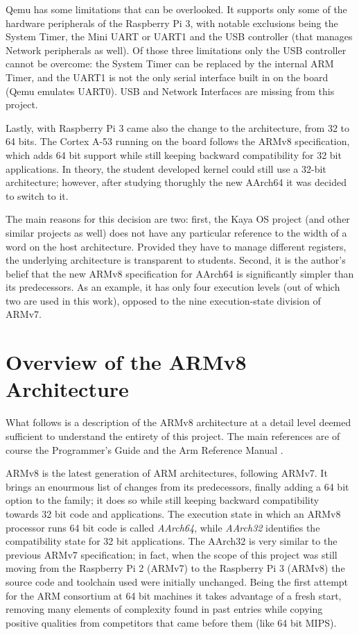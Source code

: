 \documentclass[12pt,a4paper,openright,twoside]{report}
\begin{document}
Qemu has some limitations that can be overlooked. It supports only some of the
hardware peripherals of the Raspberry Pi 3, with notable exclusions being the
System Timer, the Mini UART or UART1 and the USB controller 
(that manages Network peripherals as well).
Of those three limitations only the USB controller cannot be overcome: the 
System Timer can be replaced by the internal ARM Timer, and the UART1 is not
the only serial interface built in on the board (Qemu emulates UART0).
USB and Network Interfaces are missing from this project.

Lastly, with Raspberry Pi 3 came also the change to the architecture, from 32 
to 64 bits. The Cortex A-53 running on the board follows the ARMv8 specification,
which adds 64 bit support while still keeping backward compatibility for 32 bit
applications. In theory, the student developed kernel could still use a 32-bit
architecture; however, after studying thorughly the new AArch64 it was decided
to switch to it.

The main reasons for this decision are two: first, the Kaya OS project (and
other similar projects as well) does not have any particular reference to the
width of a word on the host architecture. Provided they have to manage different
registers, the underlying architecture is transparent to students.
Second, it is the author's belief that the new ARMv8 specification for AArch64
is significantly simpler than its predecessors. As an example, it has only four execution
levels (out of which two are used in this work), opposed to the nine execution-state 
division of ARMv7.

\clearpage{\pagestyle{empty}\cleardoublepage}
\chapter{Overview of the ARMv8 Architecture}
What follows is a description of the ARMv8 architecture at a detail level deemed
sufficient to understand the entirety of this project. The main references are 
of course the Programmer's Guide \cite{guide} and the Arm Reference Manual \cite{armarm}.

ARMv8 is the latest generation of ARM architectures, following ARMv7. It brings
an enourmous list of changes from its predecessors, finally adding a 64 bit option
to the family; it does so while still keeping backward compatibility towards 32 bit
code and applications. The execution state in which an ARMv8 processor runs 64 bit
code is called \textit{AArch64}, while \textit{AArch32} identifies the compatibility
state for 32 bit applications.
The AArch32 is very similar to the previous ARMv7 specification; in fact, when 
the scope of this project was still moving from the Raspberry Pi 2 (ARMv7) to the
Raspberry Pi 3 (ARMv8) the source code and toolchain used were initially unchanged.
Being the first attempt for the ARM consortium at 64 bit machines it takes advantage
of a fresh start, removing many elements of complexity found in past entries while
copying positive qualities from competitors that came before them (like 64 bit MIPS).
\end{document}
